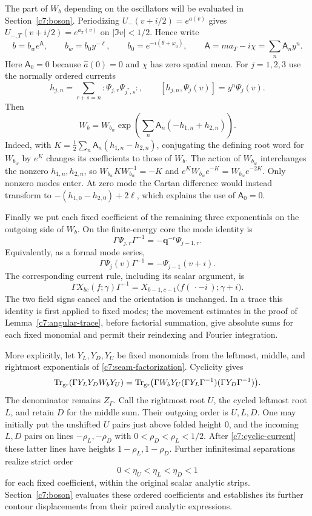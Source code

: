 The part of $W_b$ depending on the oscillators will be evaluated in Section~\ref{c7:boson}. Periodizing $U_-(v+i/2)=e^{a(v)}$ gives $U_{-,T}(v+i/2)=e^{a_T(v)}$ on $|\Im v|<1/2$. Hence write
\[
b=b_w e^{\mathsf A},\qquad
b_w=b_0y^{-\ell},\qquad b_0=e^{-i(\theta+\varphi_0)},
\qquad \mathsf A=ma_T-i\chi=\sum_n\mathsf A_ny^n .
\]
Here $\mathsf A_0=0$ because $\widehat a(0)=0$ and $\chi$ has zero spatial mean. For $j=1,2,3$ use the normally ordered currents
\[
h_{j,n}=\sum_{r+s=n}:\Psi_{j,r}\Psi_{j^*,s}:,
\qquad [h_{j,n},\Psi_j(v)]=y^n\Psi_j(v).
\]
Then
\begin{equation}\label{c7:cartan-seam}
W_b=W_{b_w}
 \exp\!\left(\sum_n\mathsf A_n(-h_{1,n}+h_{2,n})\right).
\end{equation}
Indeed, with $K=\frac12\sum_n\mathsf A_n(h_{1,n}-h_{2,n})$, conjugating the defining root word for $W_{b_w}$ by $e^K$ changes its coefficients to those of $W_b$. The action of $W_{b_w}$ interchanges the nonzero $h_{1,n},h_{2,n}$, so $W_{b_w}KW_{b_w}^{-1}=-K$ and
$e^KW_{b_w}e^{-K}=W_{b_w}e^{-2K}$.
Only nonzero modes enter. At zero mode the Cartan difference would instead transform to
$-(h_{1,0}-h_{2,0})+2\ell$, which explains the use of $\mathsf A_0=0$.

Finally we put each fixed coefficient of the remaining three exponentials on the outgoing side of $W_b$. On the finite-energy core the mode identity is
\[
\Gamma\Psi_{j,r}\Gamma^{-1}=-\mathbf q^{-r}\Psi_{j-1,r}.
\]
Equivalently, as a formal mode series,
\[
\Gamma\Psi_j(v)\Gamma^{-1}=-\Psi_{j-1}(v+i).
\]
The corresponding current rule, including its scalar argument, is
\begin{equation}\label{c7:cyclic-current}
\Gamma X_{bc}(f;\gamma)\Gamma^{-1}
=X_{b-1,c-1}\bigl(f(\,\cdot-i\,);\gamma+i\bigr).
\end{equation}
The two field signs cancel and the orientation is unchanged. In a trace this identity is first applied to fixed modes; the movement estimates in the proof of Lemma~\ref{c7:angular-trace}, before factorial summation, give absolute sums for each fixed monomial and permit their reindexing and Fourier integration.

More explicitly, let $Y_L,Y_D,Y_U$ be fixed monomials from the leftmost, middle, and rightmost exponentials of \eqref{c7:seam-factorization}. Cyclicity gives
\[
\operatorname{Tr}_{\rm gr}(\Gamma Y_LY_DW_bY_U)
=\operatorname{Tr}_{\rm gr}
 \bigl(\Gamma W_bY_U(\Gamma Y_L\Gamma^{-1})
                       (\Gamma Y_D\Gamma^{-1})\bigr).
\]
The denominator remains $Z_\Gamma$. Call the rightmost root $U$, the cycled leftmost root $L$, and retain $D$ for the middle sum. Their outgoing order is $U,L,D$. One may initially put the unshifted $U$ pairs just above folded height $0$, and the incoming $L,D$ pairs on lines $-\rho_L,-\rho_D$ with $0<\rho_D<\rho_L<1/2$. After \eqref{c7:cyclic-current} these latter lines have heights $1-\rho_L,1-\rho_D$. Further infinitesimal separations realize strict order
\[
0<\eta_U<\eta_L<\eta_D<1
\]
for each fixed coefficient, within the original scalar analytic strips. Section~\ref{c7:boson} evaluates these ordered coefficients and establishes its further contour displacements from their paired analytic expressions.

